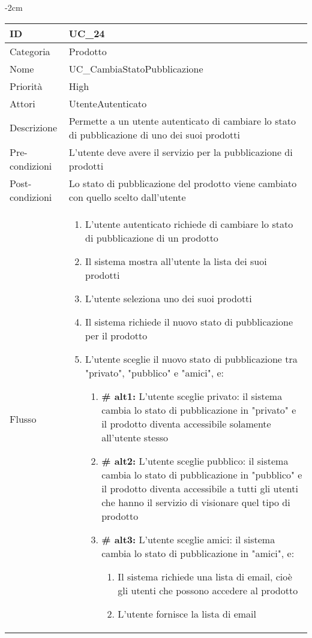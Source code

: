 \begin{center}
\begin{table}[bp]
    \centering
    \addtolength{\leftskip} {-2cm}
\begin{tabular}{ |p{2.6cm}|p{13cm}|  }
\hline
ID & UC\_24\\\hline
Categoria & Prodotto \\\hline
Nome & UC\_CambiaStatoPubblicazione \\\hline
Priorità & High \\\hline
Attori &  UtenteAutenticato \\\hline
Descrizione & Permette a un utente autenticato di cambiare lo stato di pubblicazione di uno dei suoi prodotti\\\hline
Pre-condizioni &  L'utente deve avere il servizio per la pubblicazione di prodotti\\\hline
Post-condizioni &  Lo stato di pubblicazione del prodotto viene cambiato con quello scelto dall'utente\\\hline
Flusso &  	\begin{enumerate}
			\item L'utente autenticato richiede di cambiare lo stato di pubblicazione di un prodotto
			\item Il sistema mostra all'utente la lista dei suoi prodotti
			\item L'utente seleziona uno dei suoi prodotti
			\item Il sistema richiede il nuovo stato di pubblicazione per il prodotto
			\item L'utente sceglie il nuovo stato di pubblicazione tra "privato", "pubblico" e "amici", e:
				\begin{enumerate}[  ]
					\item \textbf{\# alt1:} L'utente sceglie privato: il sistema cambia lo stato di pubblicazione in "privato" e il prodotto diventa accessibile solamente all'utente stesso
					\item \textbf{\# alt2:} L'utente sceglie pubblico: il sistema cambia lo stato di pubblicazione in "pubblico" e il prodotto diventa accessibile a tutti gli utenti che hanno il servizio di visionare quel tipo di prodotto
					\item \textbf{\# alt3:} L'utente sceglie amici: il sistema cambia lo stato di pubblicazione in "amici", e:
					\begin{enumerate}[label*=\arabic*.]
						\item Il sistema richiede una lista di email, cioè gli utenti che possono accedere al prodotto
						\item L'utente fornisce la lista di email

\end{enumerate}
\end{enumerate}
\end{enumerate}
\end{tabular}
\end{table}
\end{center}
